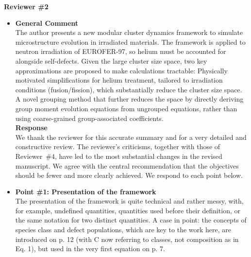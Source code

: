 \documentclass{article}
\newif\ifshowauthornotes
\newcommand{\authornote}[1]{\ifshowauthornotes{\color{red}\ [\textbf{Author action:} #1]}\fi}
\begin{document}
\begin{itemize}
\authornote{If the ablation calculations mentioned in (i) are not shown in the manuscript or supplement, either add a short table (channel switched off $\rightarrow$ change in the six observables of Table~2) or soften the wording to ``can be tested''. A one-at-a-time sensitivity table for $f^{cl}_{i}$, $f^{cl}_{v}$, $\ell$, $\rho_{\rm net}$, $\phi_{\max}$ and $\Delta H_2-\Delta H_{\rm rev}$ would answer this reviewer most directly.}
\end{itemize}

\newpage
\noindent\textbf{Reviewer \#2}
\begin{itemize}
\item \textbf{General Comment}\\
The author presents a new modular cluster dynamics framework to simulate microstructure evolution in irradiated materials. The framework is applied to neutron irradiation of EUROFER-97, so helium must be accounted for alongside self-defects. Given the large cluster size space, two key approximations are proposed to make calculations tractable: Physically motivated simplifications for helium treatment, tailored to irradiation conditions (fusion/fission), which substantially reduce the cluster size space. A novel grouping method that further reduces the space by directly deriving group moment evolution equations from ungrouped equations, rather than using coarse-grained group-associated coefficients.\\

\textbf{Response}\\
We thank the reviewer for this accurate summary and for a very detailed and constructive review. The reviewer's criticisms, together with those of Reviewer~\#4, have led to the most substantial changes in the revised manuscript. We agree with the central recommendation that the objectives should be fewer and more clearly achieved. We respond to each point below.

\item \textbf{Point \#1: Presentation of the framework}\\
The presentation of the framework is quite technical and rather messy, with, for example, undefined quantities, quantities used before their definition, or the same notation for two distinct quantities. A case in point: the concepts of species class and defect populations, which are key to the work here, are introduced on p. 12 (with C now referring to classes, not composition as in Eq. 1), but used in the very first equation on p. 7.\\


\end{itemize}
\end{document}
